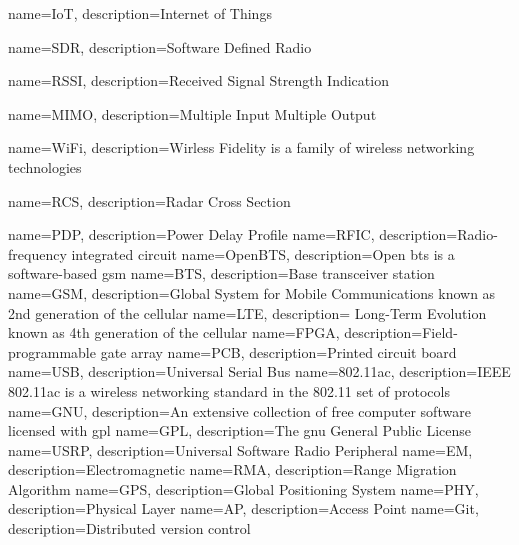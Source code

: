 {
    name=IoT,
    description={Internet of Things}
}


{
    name=SDR,
    description={Software Defined Radio}
}


{
    name=RSSI,
    description={Received Signal Strength Indication}
}


{
    name=MIMO,
    description={Multiple Input Multiple Output}
}


{
    name=WiFi,
    description={Wirless Fidelity is a family of wireless networking technologies}
}

{
    name=RCS,
    description={Radar Cross Section}
}

{
    name=PDP,
    description={Power Delay Profile}
}
{
    name=RFIC,
    description={Radio-frequency integrated circuit}
}
{
    name=OpenBTS,
    description={Open \gls{bts} is a software-based \gls{gsm}}
}
{
    name=BTS,
    description={Base transceiver station}
}
{
    name=GSM,
    description={Global System for Mobile Communications known as 2nd generation of the cellular}
}
{
    name=LTE,
    description={ Long-Term Evolution known as 4th generation of the cellular}
}
{
    name=FPGA,
    description={Field-programmable gate array}
}
{
    name=PCB,
    description={Printed circuit board}
}
{
    name=USB,
    description={Universal Serial Bus}
}
{
    name=802.11ac,
    description={IEEE 802.11ac is a wireless networking standard in the 802.11 set of protocols}
}
{
    name=GNU,
    description={An extensive collection of free computer software licensed with \gls{gpl}}
}
{
    name=GPL,
    description={The \gls{gnu} General Public License}
}
{
    name=USRP,
    description={Universal Software Radio Peripheral}
}
{
    name=EM,
    description={Electromagnetic}
}
{
    name=RMA,
    description={Range Migration Algorithm}
}
{
    name=GPS,
    description={Global Positioning System}
}
{
    name=PHY,
    description={Physical Layer}
}
{
    name=AP,
    description={Access Point }
}
{
    name=Git,
    description={Distributed version control}
}